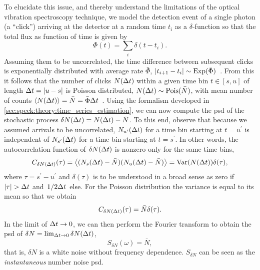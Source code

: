To elucidate this issue, and thereby understand the limitations of the optical vibration spectroscopy technique, we model the detection event of a single photon (a \enquote{click}) arriving at the detector at a random time $t_i$ as a $\delta$-function so that the total flux as function of time is given by
\begin{equation}\label{eq:setup:flux_comb}
    \Phi(t) = \sum_i \delta(t-t_i).
\end{equation}
Assuming them to be uncorrelated, the time difference between subsequent clicks is exponentially distributed with average rate $\bar{\Phi}$, $\lvert t_{i+1}-t_i\rvert\sim\operatorname{Exp}(\bar{\Phi})$~\cite{ExponentialDistributionWiki}.
From this it follows that the number of clicks $N(\Delta t)$ within a given time bin $t\in [s, u]$ of length $\Delta t = \lvert u - s\rvert$ is Poisson distributed, $N(\Delta t)\sim\operatorname{Pois}(\bar{N})$, with mean number of counts $\expval{N(\ensuremath{\Delta t})} = \bar{N} = \bar{\Phi}\Delta t$~\cite{PoissonDistributionWiki}.
Using the formalism developed in \cref{sec:speck:theory:time_series_estimation}, we can now compute the \gls{psd} of the stochastic process $\delta N(\Delta t) = N(\Delta t) - \bar{N}$.
To this end, observe that because we assumed arrivals to be uncorrelated, $N_{u^\prime}(\Delta t)$ for a time bin starting at $t=u^\prime$ is independent of $N_{s^\prime}(\Delta t)$ for a time bin starting at $t=s^\prime$.
In other words, the autocorrelation function of $\delta N(\Delta t)$ is nonzero only for the same time bins,
\begin{equation}\label{eq:setup:poisson:autocorrelation}
    C_{\delta N(\Delta t)}(\tau) = \expval{(N_s(\ensuremath{\Delta t}) - \bar{N})(N_u(\ensuremath{\Delta t}) - \bar{N})} = \operatorname{Var}(N(\Delta t))\delta(\tau),
\end{equation}
where $\tau = s^\prime - u^\prime$ and $\delta(\tau)$ is to be understood in a broad sense as zero if $\abs{\tau} > \Delta t$ and $\flatfrac{1}{2\dt}$ else.
For the Poisson distribution the variance is equal to its mean so that we obtain
\begin{equation}\label{eq:setup:poisson:autocorrelation:evaluated}
    C_{\delta N(\Delta t)}(\tau) = \bar{N}\delta(\tau).
\end{equation}
In the limit of $\Delta t\to 0$, we can then perform the Fourier transform to obtain the \gls{psd} of $\delta N = \lim_{\Delta t\to 0}\delta N(\Delta t)$,
\begin{equation}\label{eq:setup:poisson:psd}
    S_{\delta N}(\omega) = \bar{N},
\end{equation}
that is, $\delta N$ is a white noise without frequency dependence.
$S_{\delta N}$ can be seen as the \emph{instantaneous} number noise \gls{psd}.

